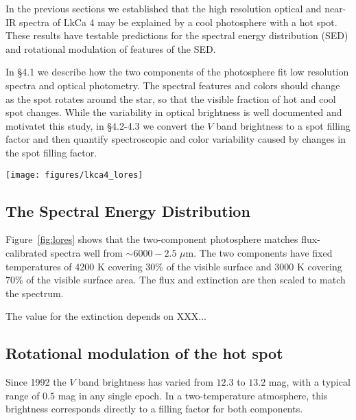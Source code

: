 \documentclass[twocolumn]{emulateapj}%
\begin{document}
In the previous sections we established that the high resolution optical and near-IR spectra of LkCa 4 may be explained by a cool photosphere with a hot spot.  These results have testable predictions for the spectral energy distribution (SED) and rotational modulation of features of the SED.


In \S 4.1 we describe how the two components of the photosphere fit low resolution spectra and optical photometry.  The spectral features and colors should change as the spot rotates around the star, so that the visible fraction of hot and cool spot changes.  While the variability in optical brightness is well documented and motivatet this study, in \S 4.2-4.3 we convert the $V$ band brightness to a spot filling factor and then quantify spectroscopic and color variability caused by changes in the spot filling factor.


\begin{figure*}
	\centering
	\texttt{[image: figures/lkca4\_lores]} 
	\caption{The low-resolution optical/near-IR spectrum of LkCa 4 is }
	\label{fig:lores}
\end{figure*}


\subsection{The Spectral Energy Distribution}

Figure~\ref{fig:lores} shows that the two-component photosphere matches flux-calibrated spectra well from $\sim 6000-2.5$ $\mu$m.  The two components have fixed temperatures of 4200 K covering 30\% of the visible surface and 3000 K covering 70\% of the visible surface area.  The flux and extinction are then scaled to match the spectrum.


The value for the extinction depends on XXX...





\subsection{Rotational modulation of the hot spot}

Since 1992 the $V$ band brightness has varied from $12.3$ to $13.2$ mag, with a typical range of $0.5$ mag in any single epoch.  In a two-temperature atmosphere, this brightness corresponds directly to a filling factor for both components.  
\end{document}
